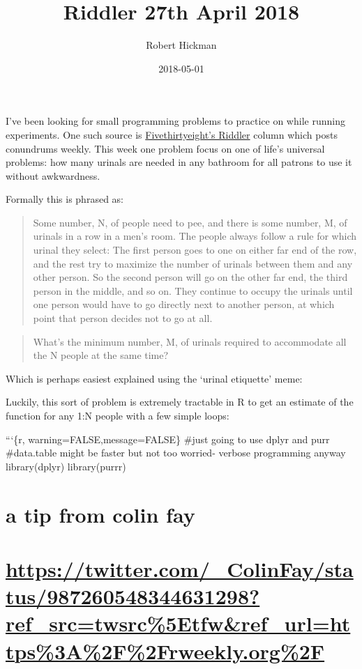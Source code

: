 \documentclass[]{article}
\title{Riddler 27th April 2018}
\author{Robert Hickman}
\date{2018-05-01}
\begin{document}
\maketitle

I've been looking for small programming problems to practice on while
running experiments. One such source is
\href{https://fivethirtyeight.com/features/how-fast-can-you-type-a-million-letters/}{Fivethirtyeight's
Riddler} column which posts conundrums weekly. This week one problem
focus on one of life's universal problems: how many urinals are needed
in any bathroom for all patrons to use it without awkwardness.

Formally this is phrased as:

\begin{quote}
Some number, N, of people need to pee, and there is some number, M, of
urinals in a row in a men's room. The people always follow a rule for
which urinal they select: The first person goes to one on either far end
of the row, and the rest try to maximize the number of urinals between
them and any other person. So the second person will go on the other far
end, the third person in the middle, and so on. They continue to occupy
the urinals until one person would have to go directly next to another
person, at which point that person decides not to go at all.
\end{quote}

\begin{quote}
What's the minimum number, M, of urinals required to accommodate all the
N people at the same time?
\end{quote}

Which is perhaps easiest explained using the `urinal etiquette' meme:

\emph{}

Luckily, this sort of problem is extremely tractable in R to get an
estimate of the function for any 1:N people with a few simple loops:

```\{r, warning=FALSE,message=FALSE\} \#just going to use dplyr and purr
\#data.table might be faster but not too worried- verbose programming
anyway library(dplyr) library(purrr)

\section{a tip from colin fay}\label{a-tip-from-colin-fay}

\section{\texorpdfstring{\url{https://twitter.com/_ColinFay/status/987260548344631298?ref_src=twsrc\%5Etfw\&ref_url=https\%3A\%2F\%2Frweekly.org\%2F}}{https://twitter.com/\_ColinFay/status/987260548344631298?ref\_src=twsrc\%5Etfw\&ref\_url=https\%3A\%2F\%2Frweekly.org\%2F}}\label{httpstwitter.com_colinfaystatus987260548344631298ref_srctwsrc5etfwref_urlhttps3a2f2frweekly.org2f}
\end{document}
